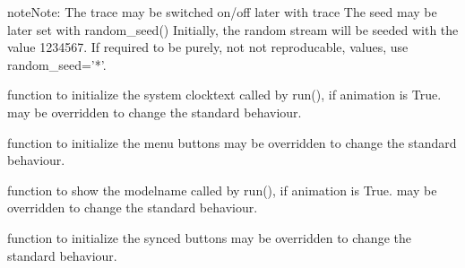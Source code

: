 \documentclass[letterpaper,10pt,english]{sphinxmanual}
\begin{document}
\begin{fulllineitems}
\begin{quote}
\begin{description}
\begin{itemize}
\end{itemize}

\end{description}\end{quote}

\begin{sphinxadmonition}{note}{Note:}
The trace may be switched on/off later with trace 
The seed may be later set with random\_seed() 
Initially, the random stream will be seeded with the value 1234567.
If required to be purely, not not reproducable, values, use
random\_seed=’*’.
\end{sphinxadmonition}

\begin{fulllineitems}
\label{\detokenize{Reference:salabim.Environment.an_clocktext}}
function to initialize the system clocktext 
called by run(), if animation is True. 
may be overridden to change the standard behaviour.

\end{fulllineitems}


\begin{fulllineitems}
\label{\detokenize{Reference:salabim.Environment.an_menu_buttons}}
function to initialize the menu buttons 
may be overridden to change the standard behaviour.

\end{fulllineitems}


\begin{fulllineitems}
\label{\detokenize{Reference:salabim.Environment.an_modelname}}
function to show the modelname 
called by run(), if animation is True. 
may be overridden to change the standard behaviour.

\end{fulllineitems}


\begin{fulllineitems}
\label{\detokenize{Reference:salabim.Environment.an_synced_buttons}}
function to initialize the synced buttons 
may be overridden to change the standard behaviour.


\end{fulllineitems}
\end{fulllineitems}
\end{document}
